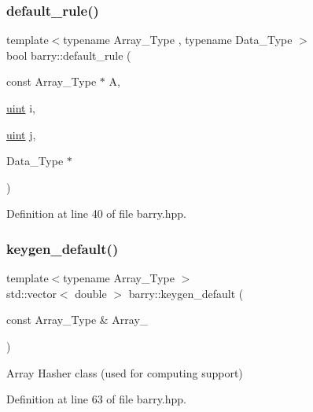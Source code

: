 \subsubsection{\texorpdfstring{default\+\_\+rule()}{default\_rule()}}
{\footnotesize\ttfamily template$<$typename Array\+\_\+\+Type , typename Data\+\_\+\+Type $>$ \\
bool barry\+::default\+\_\+rule (\begin{DoxyParamCaption}\item[{const Array\+\_\+\+Type $\ast$}]{A,  }\item[{\hyperlink{namespacebarry_a11dfc53ddb4672278319aa04f1e09a6c}{uint}}]{i,  }\item[{\hyperlink{namespacebarry_a11dfc53ddb4672278319aa04f1e09a6c}{uint}}]{j,  }\item[{Data\+\_\+\+Type $\ast$}]{ }\end{DoxyParamCaption})\hspace{0.3cm}{\ttfamily [inline]}}



Definition at line 40 of file barry.\+hpp.

\mbox{\label{namespacebarry_a22bfc7c4a1f5b5922edfd1101b8ffe3d}} 
\subsubsection{\texorpdfstring{keygen\+\_\+default()}{keygen\_default()}}
{\footnotesize\ttfamily template$<$typename Array\+\_\+\+Type $>$ \\
std\+::vector$<$ double $>$ barry\+::keygen\+\_\+default (\begin{DoxyParamCaption}\item[{const Array\+\_\+\+Type \&}]{Array\+\_\+ }\end{DoxyParamCaption})\hspace{0.3cm}{\ttfamily [inline]}}



Array Hasher class (used for computing support) 



Definition at line 63 of file barry.\+hpp.

\mbox{\label{namespacebarry_a1dcc0a46544cc9733ca8ee5619ef6d20}} 
